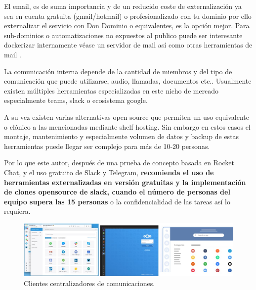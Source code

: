 El email, es de suma importancia y de un reducido coste de externalización ya sea en cuenta gratuita (gmail/hotmail) o profesionalizado con tu dominio por ello externalizar el servicio con Don Dominio\cite{c_dondominio} o equivalentes, es la opción mejor. Para sub-dominios o automatizaciones no expuestos al publico puede ser interesante dockerizar internamente véase un servidor de mail\cite{c_docker_mail} así como otras herramientas de mail \cite{c_mail_selfhosted} .

La comunicación interna depende de la cantidad de miembros y del tipo de comunicación que puede utilizarse, audio, llamadas, documentos etc.. Usualmente existen múltiples herramientas especializadas en este nicho de mercado especialmente teams\cite{c_teams}, slack\cite{c_slack} o ecosistema google.

A su vez existen varias alternativas open source que permiten un uso equivalente o clónico a las mencionadas mediante shelf hosting. Sin embargo en estos casos el montaje, mantenimiento y especialmente volumen de datos y backup de estas herramientas puede llegar ser complejo para más de 10-20 personas. 

Por lo que este autor, después de una prueba de concepto basada en Rocket Chat\cite{c_rocket_chat}, y el uso gratuito de Slack\cite{c_slack} y Telegram\cite{c_telegram}, \textbf{recomienda el uso de herramientas externalizadas en versión gratuitas y la implementación de clones opensource de slack, cuando el número de personas del equipo supera las 15 personas }o la confidencialidad de las tareas así lo requiera.

\begin{figure}[!htb]
\begin{center}
\includegraphics[width=1\textwidth]{./figuras/hub_comunicaciones.jpg}
\caption{Clientes centralizadores de comunicaciones.}
\label{F:hub_comunicaciones}
\end{center}
\end{figure}

